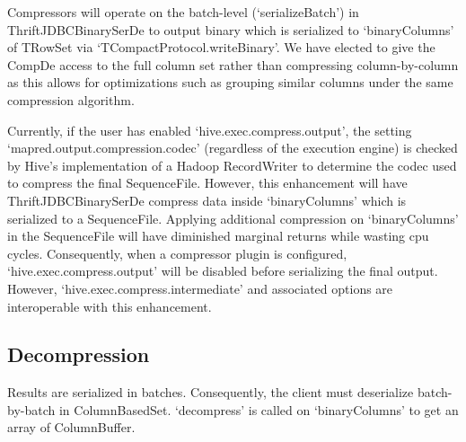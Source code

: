 \documentclass[11pt,a4paper]{article}
\begin{document}
		Compressors will operate on the batch-level (`serializeBatch') in ThriftJDBCBinarySerDe to output binary which is serialized to `binaryColumns' of TRowSet via `TCompactProtocol.writeBinary'.
		We have elected to give the CompDe access to the full column set rather than compressing column-by-column as this allows for optimizations such as grouping similar columns under the same compression algorithm.
		
		Currently, if the user has enabled `hive.exec.compress.output', the setting `mapred.output.compression.codec' (regardless of the execution engine) is checked by Hive's implementation of a Hadoop RecordWriter to determine the codec used to compress the final SequenceFile.
		However, this enhancement will have ThriftJDBCBinarySerDe compress data inside `binaryColumns' which is serialized to a SequenceFile.
		Applying additional compression on `binaryColumns' in the SequenceFile will have diminished marginal returns while wasting cpu cycles.
		Consequently, when a compressor plugin is configured,  `hive.exec.compress.output' will be disabled before serializing the final output.
		However, `hive.exec.compress.intermediate' and associated options are interoperable with this enhancement.
		
	\subsection{Decompression}
	
		Results are serialized in batches.
		Consequently, the client must deserialize batch-by-batch in ColumnBasedSet.
		`decompress' is called on `binaryColumns' to get an array of ColumnBuffer.
		
\end{document}
